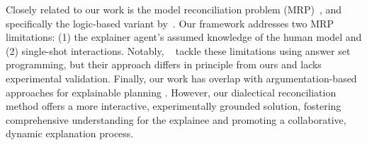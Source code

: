 \documentclass[letterpaper]{article} %
\begin{document}
 \begin{table}
  \centering
 \caption{Comparison of the four dialogue types on a topic $\varphi$ and two agent KBs: $KB_i$ (initiating) \& $KB_j$ (participating).}
 \label{dialogue_types}
 \end{table}



Closely related to our work is the model reconciliation problem (MRP)~\cite{chakraborti2017plan, sreedharan2021using, son2021model, vas21, sreedharan2022explainable}, and specifically the logic-based variant by~\citet{vas21, vasileioulogic}. Our framework addresses two MRP limitations: (1) the explainer agent's assumed knowledge of the human model and (2) single-shot interactions. Notably, %
~\citet{DungS22a} tackle these limitations using answer set programming, but their approach differs in principle from ours and lacks experimental validation. Finally, our work has overlap with argumentation-based approaches for explainable planning \cite{fan2018on,collins2019towards,oren2020argument}. However, our dialectical reconciliation method offers a more interactive, experimentally grounded solution, fostering comprehensive understanding for the explainee and promoting a collaborative, dynamic explanation process.
\end{document}
